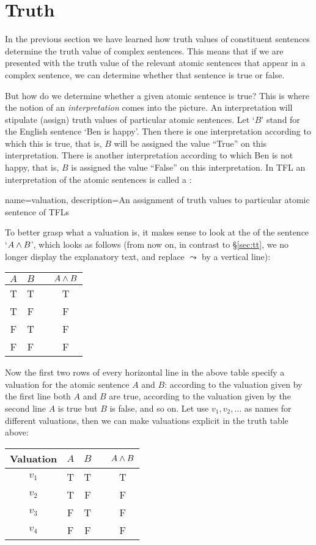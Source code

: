 \section{Truth}
In the previous section we have learned how truth values of constituent sentences determine the truth value of complex sentences. This means that if we are presented with the truth value of the relevant atomic sentences that appear in a complex sentence, we can determine whether that sentence is true or false.

But how do we determine whether a given atomic sentence is true? This is where the notion of an \emph{interpretation} comes into the picture. An interpretation will stipulate (assign) truth values of particular atomic sentences. Let `$B$' stand for the English sentence `Ben is happy'. Then there is one interpretation according to which this is true, that is, $B$ will be assigned the value ``True'' on this interpretation. There is another interpretation according to which Ben is not happy, that is, $B$ is assigned the value ``False'' on this interpretation. In TFL an interpretation of the atomic sentences is called a :


{
name=valuation,
description={An assignment of \glspl{truth value} to particular atomic \glspl{sentence of TFL}}
}

To better grasp what a valuation is, it makes sense to look at the  of the sentence `$A\mathbin{\wedge} B$', which looks as follows (from now on, in contrast to \S\ref{sec:tt}, we no longer display the explanatory text, and replace $\leadsto$ by a vertical line):

\begin{center}
\begin{tabular}{ccc|c}
$A$&$B$&&$A\mathbin{\wedge} B$\\\hline
T & T && T\\
T & F && F\\
F & T && F\\
F & F && F
\end{tabular}
\end{center}

Now the first two rows of every horizontal line in the above table specify a valuation for the atomic sentence $A$ and $B$: according to the valuation given by the first line both $A$ and $B$ are true, according to the valuation given by the second line $A$ is true but $B$ is false, and so on. Let use $v_1,v_2,\ldots$ as names for different valuations, then we can make valuations explicit in the truth table above:
\begin{center}
\begin{tabular}{c|ccc|c}
Valuation&$A$&$B$&&$A\mathbin{\wedge} B$\\\hline
$v_1$&T & T && T\\
$v_2$&T & F && F\\
$v_3$&F & T && F\\
$v_4$&F & F && F
\end{tabular}
\end{center}

